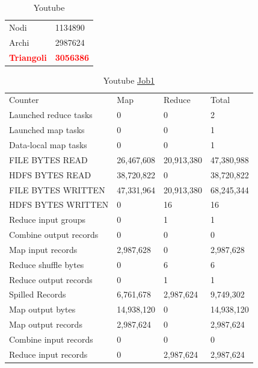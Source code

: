 \documentclass[paper=a4, fontsize=11pt]{scrartcl}	%
\numberwithin{equation}{section}															%
\numberwithin{figure}{section}																%
\numberwithin{table}{section}																%
\begin{document}
\begin{table}[!h]
	\centering
	\caption{Youtube}
	\label{my-label}
	\begin{tabular}{ll}
		Nodi		 & 1134890\\
		Archi		 & 2987624 \\
		\textbf{\textcolor{red}{Triangoli}}	& \textbf{\textcolor{red}{3056386}} \\		
	\end{tabular}
\end{table}
\begin{table}[!h]
	\centering
	\caption{Youtube \href{http://hadoop-compute0.di.univr.it:50030/jobdetails.jsp?jobid=job_201603141010_12291}{Job1}}
	\label{my-label}
	\begin{tabular}{llll}
		Counter	&Map	&Reduce	&Total\\
		Launched reduce tasks	&0	&0	&2\\
		Launched map tasks	&0	&0	&1\\
		Data-local map tasks	&0	&0	&1\\
		FILE BYTES READ	&26,467,608	&20,913,380	&47,380,988\\
		HDFS BYTES READ	&38,720,822	&0	&38,720,822\\
		FILE BYTES WRITTEN	&47,331,964	&20,913,380	&68,245,344\\
		HDFS BYTES WRITTEN	&0	&16	&16\\
		Reduce input groups	&0	&1	&1\\
		Combine output records	&0	&0	&0\\
		Map input records	&2,987,628	&0	&2,987,628\\
		Reduce shuffle bytes	&0	&6	&6\\
		Reduce output records	&0	&1	&1\\
		Spilled Records	&6,761,678	&2,987,624	&9,749,302\\
		Map output bytes	&14,938,120	&0	&14,938,120\\
		Map output records	&2,987,624	&0	&2,987,624\\
		Combine input records	&0	&0	&0\\
		Reduce input records	&0	&2,987,624	&2,987,624\\
	\end{tabular}
\end{table}
\end{document}
